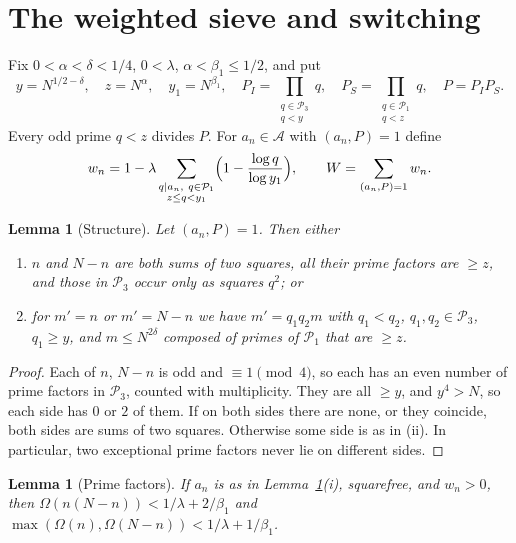 \documentclass[11pt]{amsart}
\newtheorem{lemma}[theorem]{Lemma}
\theoremstyle{remark}
\newcommand{\cA}{\mathcal{A}}
\newcommand{\cP}{\mathcal{P}}
\begin{document}
\section{The weighted sieve and switching}\label{sec:switch}

Fix $0<\alpha<\delta<1/4$, $0<\lambda$, $\alpha<\beta_1\le1/2$, and put
\[
y=N^{1/2-\delta},\quad z=N^{\alpha},\quad y_1=N^{\beta_1},\quad
P_I=\prod_{\substack{q\in\cP_3\\ q<y}}q,\quad P_S=\prod_{\substack{q\in\cP_1\\ q<z}}q,\quad P=P_IP_S .
\]
Every odd prime $q<z$ divides $P$. For $a_n\in\cA$ with $(a_n,P)=1$ define
\[
w_n=1-\lambda\sum_{\substack{q\mid a_n,\ q\in\cP_1\\ z\le q<y_1}}\Bigl(1-\frac{\log q}{\log y_1}\Bigr),
\qquad W=\sum_{(a_n,P)=1}w_n .
\]

\begin{lemma}[Structure]\label{lem:structure}
Let $(a_n,P)=1$. Then either
\begin{enumerate}
\item[(i)] $n$ and $N-n$ are both sums of two squares, all their prime factors are $\ge z$, and those
in $\cP_3$ occur only as squares $q^2$; or
\item[(ii)] for $m'=n$ or $m'=N-n$ we have $m'=q_1q_2m$ with $q_1<q_2$, $q_1,q_2\in\cP_3$, $q_1\ge y$, and
$m\le N^{2\delta}$ composed of primes of $\cP_1$ that are $\ge z$.
\end{enumerate}
\end{lemma}

\begin{proof}
Each of $n$, $N-n$ is odd and $\equiv1\pmod4$, so each has an even number of prime factors in $\cP_3$,
counted with multiplicity. They are all $\ge y$, and $y^4>N$, so each side has $0$ or $2$ of them. If on both
sides there are none, or they coincide, both sides are sums of two squares. Otherwise some side is as in
(ii). In particular, two exceptional prime factors never lie on different sides.
\end{proof}

\begin{lemma}[Prime factors]\label{lem:omega}
If $a_n$ is as in Lemma~\ref{lem:structure}(i), squarefree, and $w_n>0$, then
$\Omega(n(N-n))<1/\lambda+2/\beta_1$ and $\max(\Omega(n),\Omega(N-n))<1/\lambda+1/\beta_1$.
\end{lemma}
\end{document}
